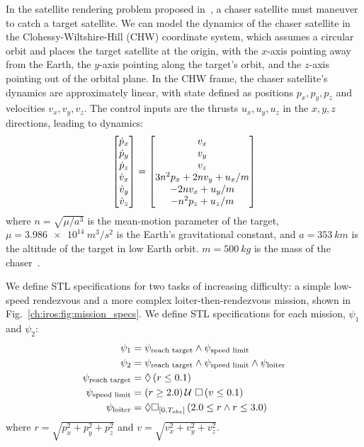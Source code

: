 In the satellite rendering problem proposed in~\cite{jewisonSpacecraftBenchmarkProblem2016}, a chaser satellite must maneuver to catch a target satellite. We can model the dynamics of the chaser satellite in the Clohessy-Wiltshire-Hill (CHW) coordinate system, which assumes a circular orbit and places the target satellite at the origin, with the $x$-axis pointing away from the Earth, the $y$-axis pointing along the target's orbit, and the $z$-axis pointing out of the orbital plane. In the CHW frame, the chaser satellite's dynamics are approximately linear, with state defined as positions $p_x, p_y, p_z$ and velocities $v_x, v_y, v_z$. The control inputs are the thrusts $u_x, u_y, u_z$ in the $x, y, z$ directions, leading to dynamics:
\begin{align*}
    \begin{bmatrix}\dot{p}_x              \\ \dot{p}_y \\ \dot{p}_z \\ \dot{v}_x \\ \dot{v}_y \\ \dot{v}_z\end{bmatrix} = \begin{bmatrix}
    v_x                         \\
    v_y                         \\
    v_z                         \\
    3n^2 p_x + 2n v_y + u_x / m \\
    -2n v_x + u_y / m           \\
        -n^2 p_z + u_z / m
    \end{bmatrix}
\end{align*}
where $n = \sqrt{\mu / a^3}$ is the mean-motion parameter of the target, $\mu = \SI{3.986e14}{m^3/s^2}$ is the Earth's gravitational constant, and $a = \SI{353}{km}$ is the altitude of the target in low Earth orbit. $m = \SI{500}{kg}$ is the mass of the chaser~\cite{jewisonSpacecraftBenchmarkProblem2016}.

We define STL specifications for two tasks of increasing difficulty: a simple low-speed rendezvous and a more complex loiter-then-rendezvous mission, shown in Fig.~\ref{ch:iros:fig:mission_specs}. We define STL specifications for each mission, $\psi_1$ and $\psi_2$:
\begin{align*}
    \psi_1                   & = \psi_\text{reach target} \wedge \psi_\text{speed limit}                           \\
    \psi_2                   & = \psi_\text{reach target} \wedge \psi_\text{speed limit} \wedge \psi_\text{loiter} \\
    \psi_\text{reach target} & = \lozenge \left( r \leq 0.1 \right)                                                       \\
    \psi_\text{speed limit}  & = \left( r \geq 2.0 \right) \mathcal{U}\ \square \left( v \leq 0.1 \right)                                   \\
    \psi_\text{loiter}       & = \lozenge \square_{[0, T_{obs}]} \left( 2.0 \leq r \wedge r \leq 3.0 \right)
\end{align*}
where $r = \sqrt{p_x^2 + p_y^2 + p_z^2}$ and $v = \sqrt{v_x^2 + v_y^2 + v_z^2}$.

